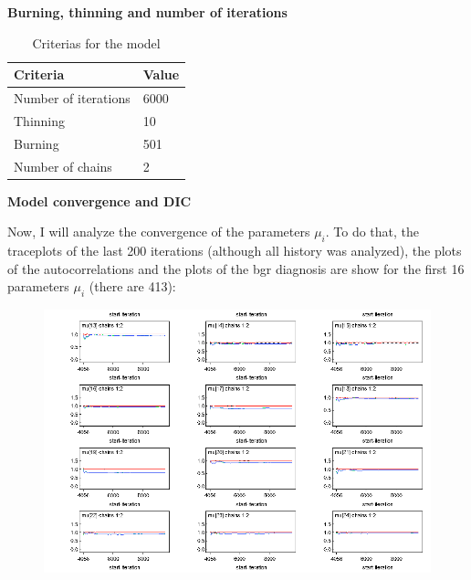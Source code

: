 \documentclass{article}
\begin{document}
\textbf{Burning, thinning and number of iterations}
\begin{table}[ht!]
\centering
\caption{Criterias for the model}
\begin{tabular}{|l|l|}
\hline
Criteria             & Value \\ \hline
Number of iterations & 6000 \\ \hline
Thinning             & 10    \\ \hline
Burning              & 501  \\ \hline
Number of chains     & 2     \\ \hline
\end{tabular}
\end{table}

\textbf{Model convergence and DIC}

Now, I will analyze the convergence of the parameters $\mu_i$. To do that, the traceplots of the last 200 iterations (although all history was analyzed), the plots of the autocorrelations and the plots of the bgr diagnosis are show for the first 16 parameters $\mu_i$ (there are 413):

\begin{figure}[ht!]
\centering
\includegraphics[width=14cm]{figures/model3_mu2.png}
\end{figure}
\end{document}
